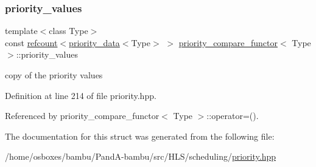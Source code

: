 \subsubsection{\texorpdfstring{priority\+\_\+values}{priority\_values}}
{\footnotesize\ttfamily template$<$class Type$>$ \\
const \hyperlink{structrefcount}{refcount}$<$\hyperlink{structpriority__data}{priority\+\_\+data}$<$Type$>$ $>$ \hyperlink{structpriority__compare__functor}{priority\+\_\+compare\+\_\+functor}$<$ Type $>$\+::priority\+\_\+values\hspace{0.3cm}{\ttfamily [private]}}



copy of the priority values 



Definition at line 214 of file priority.\+hpp.



Referenced by priority\+\_\+compare\+\_\+functor$<$ Type $>$\+::operator=().



The documentation for this struct was generated from the following file\+:\begin{DoxyCompactItemize}
\item 
/home/osboxes/bambu/\+Pand\+A-\/bambu/src/\+H\+L\+S/scheduling/\hyperlink{priority_8hpp}{priority.\+hpp}\end{DoxyCompactItemize}
